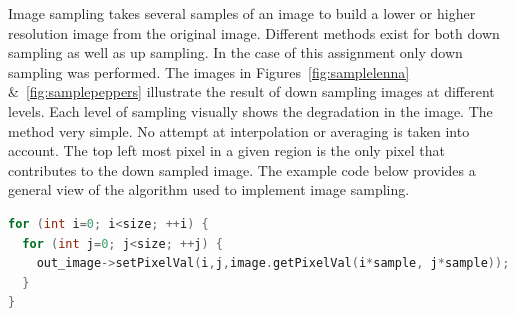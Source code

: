 \documentclass[letterpaper,10pt]{article}
\begin{document}
Image sampling takes several samples of an image to build a lower or higher resolution image from the original image. Different methods exist for both down sampling as well as up sampling. In the case of this assignment only down sampling was performed. The images in Figures~\ref{fig:samplelenna} \&~\ref{fig:samplepeppers} illustrate the result of down sampling images at different levels. Each level of sampling visually shows the degradation in the image. The method very simple. No attempt at interpolation or averaging is taken into account. The top left most pixel in a given region is the only pixel that contributes to the down sampled image. The example code below provides a general view of the algorithm used to implement image sampling.

\begin{lstlisting}[frame=single, language=c++]
for (int i=0; i<size; ++i) {
  for (int j=0; j<size; ++j) {
    out_image->setPixelVal(i,j,image.getPixelVal(i*sample, j*sample));
  }
}
\end{lstlisting}
\end{document}
